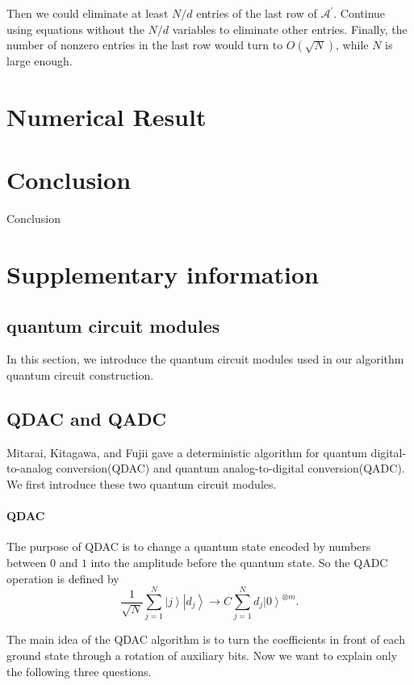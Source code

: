 \documentclass[%
 reprint,
 amsmath,amssymb,
pra,
]{revtex4-1}
\begin{document}
Then we could eliminate at least $N/d$ entries of the last row of $\mathcal{A^{\prime}}$. Continue using equations without the $N/d$ variables to eliminate other entries. Finally, the number of nonzero entries in the last row would turn to $O(\sqrt{N})$, while $N$ is large enough.
\fi



\section{Numerical Result}
\newpage



\section{Conclusion}
Conclusion



\section{Supplementary information}
\subsection{quantum circuit modules}
In this section, we introduce the quantum circuit modules used in our algorithm quantum circuit construction.


\subsection{QDAC and QADC}
Mitarai, Kitagawa, and Fujii \cite{mitarai_quantum_2019} gave a deterministic algorithm for quantum digital-to-analog conversion(QDAC) and quantum analog-to-digital conversion(QADC). We first introduce these two quantum circuit modules.
\paragraph{QDAC}

The purpose of QDAC is to change a quantum state encoded by numbers between $0$ and $1$ into the amplitude before the quantum state. So the QADC operation is defined by
\[\frac{1}{{\sqrt N }}\sum\limits_{j = 1}^N {\left| j \right\rangle \left| {{d_j}} \right\rangle  \to C\sum\limits_{j = 1}^N {{d_j}{{\left| 0 \right\rangle }^{ \otimes m}}} }. \]

The main idea of the QDAC algorithm is to turn the coefficients in front of each ground state through a rotation of auxiliary bits. Now we want to explain only the following three questions.
\end{document}
